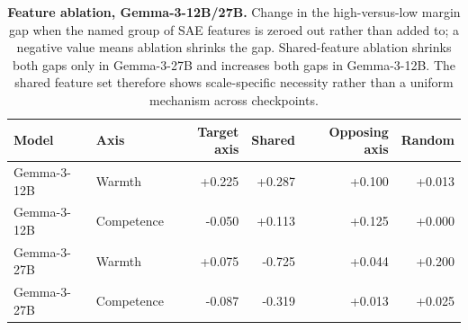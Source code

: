 \begin{table}[H]
\centering
\small
\begin{tabular}{@{}llrrrr@{}}
\toprule
Model & Axis & Target axis & Shared & Opposing axis & Random \\
\midrule
Gemma-3-12B & Warmth & +0.225 & +0.287 & +0.100 & +0.013 \\
Gemma-3-12B & Competence & -0.050 & +0.113 & +0.125 & +0.000 \\
Gemma-3-27B & Warmth & +0.075 & -0.725 & +0.044 & +0.200 \\
Gemma-3-27B & Competence & -0.087 & -0.319 & +0.013 & +0.025 \\
\bottomrule
\end{tabular}
\caption{\textbf{Feature ablation, Gemma-3-12B/27B.} Change in the high-versus-low margin gap when the named group of SAE features is zeroed out rather than added to; a negative value means ablation shrinks the gap. Shared-feature ablation shrinks both gaps only in Gemma-3-27B and increases both gaps in Gemma-3-12B. The shared feature set therefore shows scale-specific necessity rather than a uniform mechanism across checkpoints.}
\label{tab:gemma_scope_ablation}
\end{table}
